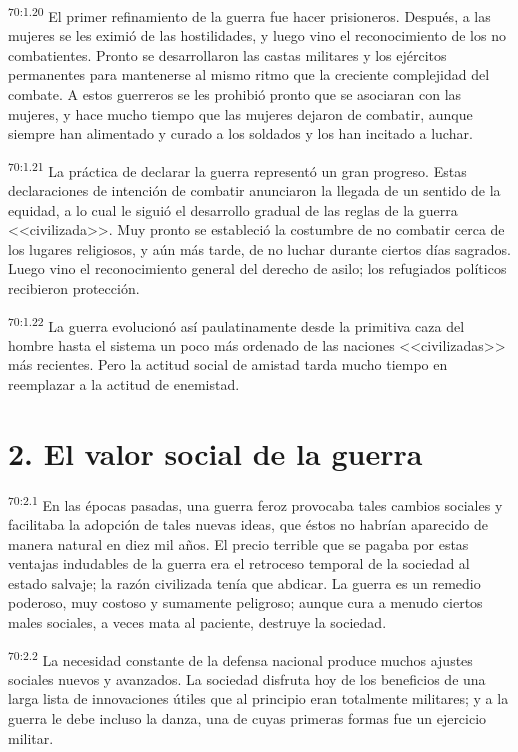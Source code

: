 \par
\textsuperscript{70:1.20} El primer refinamiento de la guerra fue hacer prisioneros. Después, a las mujeres se les eximió de las hostilidades, y luego vino el reconocimiento de los no combatientes. Pronto se desarrollaron las castas militares y los ejércitos permanentes para mantenerse al mismo ritmo que la creciente complejidad del combate. A estos guerreros se les prohibió pronto que se asociaran con las mujeres, y hace mucho tiempo que las mujeres dejaron de combatir, aunque siempre han alimentado y curado a los soldados y los han incitado a luchar.

\par
\textsuperscript{70:1.21} La práctica de declarar la guerra representó un gran progreso. Estas declaraciones de intención de combatir anunciaron la llegada de un sentido de la equidad, a lo cual le siguió el desarrollo gradual de las reglas de la guerra <<civilizada>>. Muy pronto se estableció la costumbre de no combatir cerca de los lugares religiosos, y aún más tarde, de no luchar durante ciertos días sagrados. Luego vino el reconocimiento general del derecho de asilo; los refugiados políticos recibieron protección.

\par
\textsuperscript{70:1.22} La guerra evolucionó así paulatinamente desde la primitiva caza del hombre hasta el sistema un poco más ordenado de las naciones <<civilizadas>> más recientes. Pero la actitud social de amistad tarda mucho tiempo en reemplazar a la actitud de enemistad.

\section*{2. El valor social de la guerra}
\par
\textsuperscript{70:2.1} En las épocas pasadas, una guerra feroz provocaba tales cambios sociales y facilitaba la adopción de tales nuevas ideas, que éstos no habrían aparecido de manera natural en diez mil años. El precio terrible que se pagaba por estas ventajas indudables de la guerra era el retroceso temporal de la sociedad al estado salvaje; la razón civilizada tenía que abdicar. La guerra es un remedio poderoso, muy costoso y sumamente peligroso; aunque cura a menudo ciertos males sociales, a veces mata al paciente, destruye la sociedad.

\par
\textsuperscript{70:2.2} La necesidad constante de la defensa nacional produce muchos ajustes sociales nuevos y avanzados. La sociedad disfruta hoy de los beneficios de una larga lista de innovaciones útiles que al principio eran totalmente militares; y a la guerra le debe incluso la danza, una de cuyas primeras formas fue un ejercicio militar.

